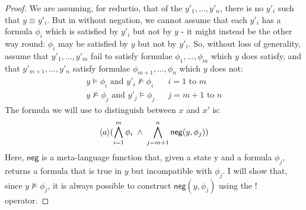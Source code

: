 \begin{proof}
We are assuming, for reductio, that of the $y'_1, ..., y'_n$, there is no $y'_i$ such that $y \equiv y'_i$.
But in \ELABR{} without negation, we cannot assume that each $y'_i$ has a formula $\phi_i$ which is satisfied by $y'_i$ but not by $y$ - it might instead be the other way round: $\phi_i$ may be satisfied by $y$ but not by $y'_i$. So, without loss of generality, assume that $y'_1, ..., y'_m$ fail to satisfy formulae $\phi_1, ..., \phi_m$ which $y$ does satisfy, and that $y'_{m+1}, ..., y'_n$ satisfy formulae $\phi_{m+1}, ..., \phi_n$ which $y$ does not:
\begin{eqnarray*}
y \models \phi_i \mbox{ and } y'_i \nvDash \phi_i & & i = 1 \mbox{ to } m  \\
y \nvDash \phi_j \mbox{ and } y'_j \models \phi_j & & j = m+1 \mbox{ to } n 
\end{eqnarray*}
The formula we will use to distinguish between $x$ and $x'$ is:
\[
 \langle a \rangle ( \bigwedge_{i=1}^m \phi_i \; \land \; \bigwedge_{j=m+1}^n \mathsf{neg}(y, \phi_j))
 \]
 Here, $\mathsf{neg}$ is a meta-language function that, given a state y and a formula $\phi_j$, returns a formula that is true in $y$ but incompatible with $\phi_j$. I will show that, since $y \nvDash \phi_j$, it is always possible to construct $ \mathsf{neg}(y, \phi_j)$ using the $!$ operator.


\end{proof}

